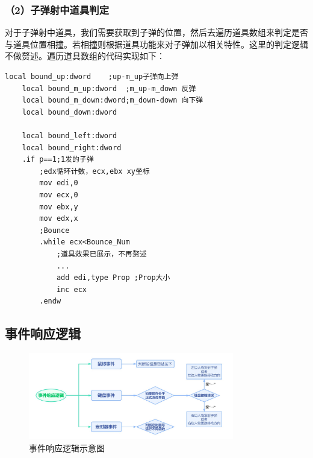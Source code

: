 \subsubsection{（2）子弹射中道具判定}
\par
对于子弹射中道具，我们需要获取到子弹的位置，然后去遍历道具数组来判定是否与道具位置相撞。若相撞则根据道具功能来对子弹加以相关特性。这里的判定逻辑不做赘述。遍历道具数组的代码实现如下：
\begin{lstlisting}[language={[x86masm]Assembler}]	
	local bound_up:dword	;up-m_up子弹向上弹
	local bound_m_up:dword	;m_up-m_down 反弹
	local bound_m_down:dword;m_down-down 向下弹
	local bound_down:dword

	local bound_left:dword
	local bound_right:dword
	.if p==1;1发的子弹
		;edx循环计数，ecx,ebx xy坐标
		mov edi,0
		mov ecx,0
		mov ebx,y
		mov edx,x
		;Bounce
		.while ecx<Bounce_Num
			;道具效果已展示，不再赘述
			...
			add edi,type Prop ;Prop大小
			inc ecx	
		.endw
\end{lstlisting}
\subsection{事件响应逻辑}
\begin{figure}[htbp]
    \vspace{13pt} %
    \centering
    \includegraphics[width=0.8\textwidth]{images/3-8.jpg}
    \caption{事件响应逻辑示意图}%
\end{figure}

